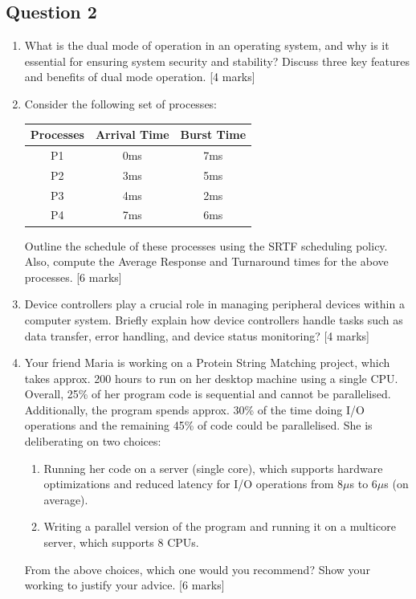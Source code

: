 \newpage
\subsection{Question 2}

\begin{enumerate}[label=(\alph*)]
    \item What is the dual mode of operation in an operating system, and why is it essential for ensuring system security and stability? Discuss three key features and benefits of dual mode operation.
    \hfill [4 marks]

    \item Consider the following set of processes:

    \begin{center}
    \begin{tabular}{|c|c|c|}
    \hline
    Processes & Arrival Time & Burst Time \\
    \hline
    P1 & 0ms & 7ms \\
    P2 & 3ms & 5ms \\
    P3 & 4ms & 2ms \\
    P4 & 7ms & 6ms \\
    \hline
    \end{tabular}
    \end{center}

    Outline the schedule of these processes using the SRTF scheduling policy. Also, compute the Average Response and Turnaround times for the above processes.
    \hfill [6 marks]

    \item Device controllers play a crucial role in managing peripheral devices within a computer system. Briefly explain how device controllers handle tasks such as data transfer, error handling, and device status monitoring?
    \hfill [4 marks]

    \item Your friend Maria is working on a Protein String Matching project, which takes approx. 200 hours to run on her desktop machine using a single CPU. Overall, 25\% of her program code is sequential and cannot be parallelised. Additionally, the program spends approx. 30\% of the time doing I/O operations and the remaining 45\% of code could be parallelised. She is deliberating on two choices:
    
    \begin{enumerate}[label=(\roman*)]
        \item Running her code on a server (single core), which supports hardware optimizations and reduced latency for I/O operations from 8$\mu$s to 6$\mu$s (on average).
        
        \item Writing a parallel version of the program and running it on a multicore server, which supports 8 CPUs.
    \end{enumerate}
    
    From the above choices, which one would you recommend? Show your working to justify your advice.
    \hfill [6 marks]
\end{enumerate}
\pagebreak
